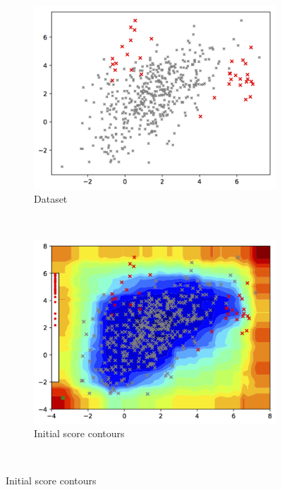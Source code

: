 \documentclass{article} %
\begin{document}
\begin{figure}
	\centering
	\begin{subfigure}[b]{0.3\textwidth}
		\includegraphics[width=\textwidth]{toy2_dataset}
		\caption{Dataset}
		\label{fig:dataset}
	\end{subfigure}
	~ %
	\begin{subfigure}[b]{0.3\textwidth}
		\includegraphics[width=\textwidth]{toy2_iter_00}
		\caption{Initial score contours}
		\label{fig:baseline_contours}
	\end{subfigure}
	~ %

\end{figure}
\end{document}
